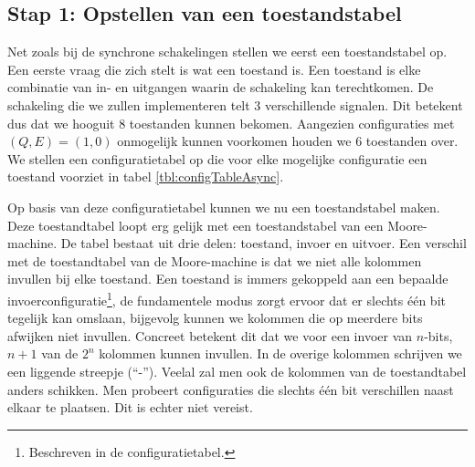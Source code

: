 \subsection{Stap 1: Opstellen van een toestandstabel}
Net zoals bij de synchrone schakelingen stellen we eerst een toestandstabel op. Een eerste vraag die zich stelt is wat een toestand is. Een toestand is elke combinatie van in- en uitgangen waarin de schakeling kan terechtkomen. De schakeling die we zullen implementeren telt 3 verschillende signalen. Dit betekent dus dat we hooguit 8 toestanden kunnen bekomen. Aangezien configuraties met $\left(Q,E\right)=\left(1,0\right)$ onmogelijk kunnen voorkomen houden we 6 toestanden over. We stellen een configuratietabel op die voor elke mogelijke configuratie een toestand voorziet in tabel \ref{tbl:configTableAsync}.
\begin{table}[hbt]
\centering
{}
\caption{Configuratie- en toestandstabel van het leidend voorbeeld.}
\end{table}
Op basis van deze configuratietabel kunnen we nu een toestandstabel maken. Deze toestandtabel loopt erg gelijk met een toestandstabel van een Moore-machine. De tabel bestaat uit drie delen: toestand, invoer en uitvoer. Een verschil met de toestandtabel van de Moore-machine is dat we niet alle kolommen invullen bij elke toestand. Een toestand is immers gekoppeld aan een bepaalde invoerconfiguratie\footnote{Beschreven in de configuratietabel.}, de fundamentele modus zorgt ervoor dat er slechts \'e\'en bit tegelijk kan omslaan, bijgevolg kunnen we kolommen die op meerdere bits afwijken niet invullen. Concreet betekent dit dat we voor een invoer van $n$-bits, $n+1$ van de $2^n$ kolommen kunnen invullen. In de overige kolommen schrijven we een liggende streepje (``-''). Veelal zal men ook de kolommen van de toestandtabel anders schikken. Men probeert configuraties die slechts \'e\'en bit verschillen naast elkaar te plaatsen. Dit is echter niet vereist.
